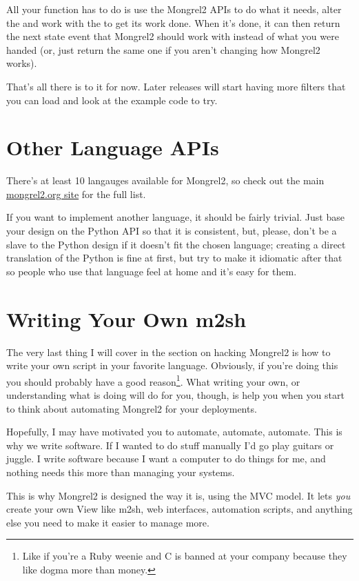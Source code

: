 All your  function has to do is use the
Mongrel2 APIs to do what it needs, alter the  and
work with the  to get its work done.  When it's done,
it can then return the next state event that Mongrel2 should work
with instead of what you were handed (or, just return the same one
if you aren't changing how Mongrel2 works).

That's all there is to it for now.  Later releases will start having
more filters that you can load and look at the example code to try.

\section{Other Language APIs}

There's at least 10 langauges available for Mongrel2, so check out the
main \href{http://mongrel2.org}{mongrel2.org site} for the full list.

If you want to implement another language, it should be fairly trivial.
Just base your design on the Python API so that it is consistent, but, please,
don't be a slave to the Python design if it doesn't fit the chosen language;
creating a direct translation of the Python is fine at first, but try
to make it idiomatic after that so people who use that language feel at
home and it's easy for them.


\section{Writing Your Own m2sh}

The very last thing I will cover in the section on hacking Mongrel2 is how to
write your own  script in your favorite language.  Obviously, if
you're doing this you should probably have a good reason\footnote{Like if
you're a Ruby weenie and C is banned at your company because they like
dogma more than money.}.  What writing your own, or understanding what
 is doing will do for you, though, is help you when you start to
think about automating Mongrel2 for your deployments.

Hopefully, I may have motivated you to automate, automate, automate.
This is why we write software.  If I wanted to do stuff manually I'd
go play guitars or juggle.  I write software because I want a computer
to do things for me, and nothing needs this more than managing your systems.

This is why Mongrel2 is designed the way it is, using the MVC model.  It
lets \emph{you} create your own View like m2sh, web interfaces, automation
scripts, and anything else you need to make it easier to manage more.


